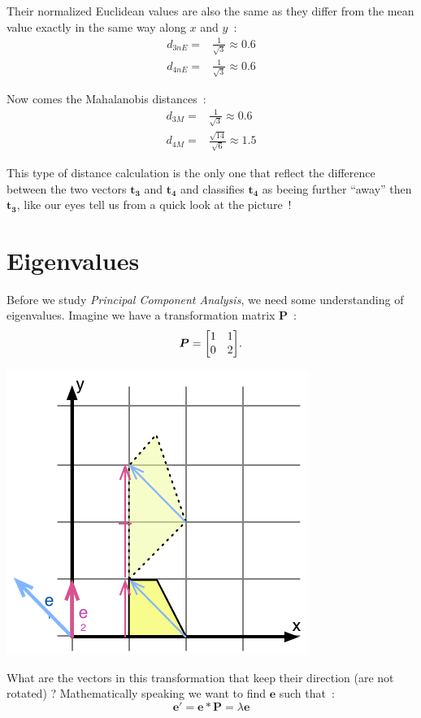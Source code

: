 \documentclass[11pt,twocolumn]{amsart} %
\newcommand{\ve}[1]{\boldsymbol{#1}}
\newcommand{\ma}[1]{\boldsymbol{#1}}
\newenvironment{m}{\begin{bmatrix}}{\end{bmatrix}}
\begin{document}
Their normalized Euclidean values are also the same as they differ from the mean value exactly in the same way along $x$ and $y$~:
\begin{align*}
  d_{3nE} = & \frac{1}{\sqrt{3}} \approx 0.6\\
  d_{4nE} = & \frac{1}{\sqrt{3}} \approx 0.6
\end{align*}

Now comes the Mahalanobis distances~:
\begin{align*}
  d_{3M} = & \frac{1}{\sqrt{3}} \approx 0.6\\
  d_{4M} = & \frac{\sqrt{14}}{\sqrt{6}} \approx 1.5
\end{align*}

This type of distance calculation is the only one that reflect the difference between the two vectors $\ve{t_3}$ and $\ve{t_4}$ and classifies $\ve{t_4}$ as beeing further ``away'' then $\ve{t_3}$, like our eyes tell us from a quick look at the picture~!

\section{Eigenvalues}

Before we study \emph{Principal Component Analysis}, we need some understanding of eigenvalues. Imagine we have a transformation matrix $\ma{P}$~:
\[
  \ma{P} = \begin{m} 1 & 1 \\ 0 & 2 \end{m}.
\]

\includegraphics{eigen.pdf}

What are the vectors in this transformation that keep their direction (are not rotated) ? Mathematically speaking we want to find $\ve{e}$ such that~:
\[
  \ve{e'} = \ve{e} * \ma{P} = \lambda \ve{e}
\]
\end{document}
